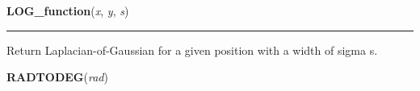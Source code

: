     \label{multireg:findobjects:LOG_function}
    \vspace{0.5ex}

    \begin{boxedminipage}{\textwidth}

    \raggedright \textbf{LOG\_function}(\textit{x}, \textit{y}, \textit{s})

    \vspace{-1.5ex}

    \rule{\textwidth}{0.5\fboxrule}
    Return Laplacian-of-Gaussian for a given position with a width of 
    sigma s.

    \vspace{1ex}

    \end{boxedminipage}

    \label{multireg:findobjects:RADTODEG}
    \vspace{0.5ex}

    \begin{boxedminipage}{\textwidth}

    \raggedright \textbf{RADTODEG}(\textit{rad})

    \end{boxedminipage}

